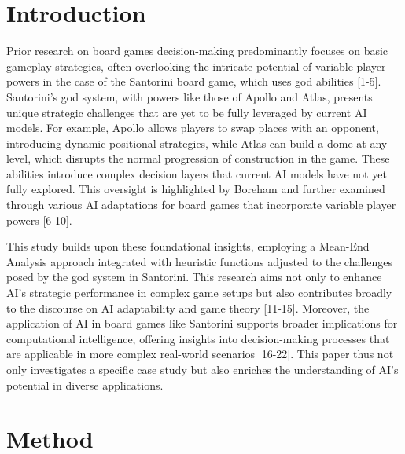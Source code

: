 \documentclass{telkomnika}
\begin{document}

\section{Introduction}
\label{}
Prior research on board games decision-making predominantly focuses on basic gameplay strategies, often overlooking the intricate potential of variable player powers in the case of the Santorini board game, which uses god abilities [1-5]. Santorini’s god system, with powers like those of Apollo and Atlas, presents unique strategic challenges that are yet to be fully leveraged by current AI models. For example, Apollo allows players to swap places with an opponent, introducing dynamic positional strategies, while Atlas can build a dome at any level, which disrupts the normal progression of construction in the game. These abilities introduce complex decision layers that current AI models have not yet fully explored. This oversight is highlighted by Boreham \cite{Boreham2019} and further examined through various AI adaptations for board games that incorporate variable player powers [6-10].

This study builds upon these foundational insights, employing a Mean-End Analysis approach integrated with heuristic functions adjusted to the challenges posed by the god system in Santorini. This research aims not only to enhance AI's strategic performance in complex game setups but also contributes broadly to the discourse on AI adaptability and game theory [11-15]. Moreover, the application of AI in board games like Santorini supports broader implications for computational intelligence, offering insights into decision-making processes that are applicable in more complex real-world scenarios [16-22]. This paper thus not only investigates a specific case study but also enriches the understanding of AI's potential in diverse applications.

\section{Method}
\label{}
\end{document}
